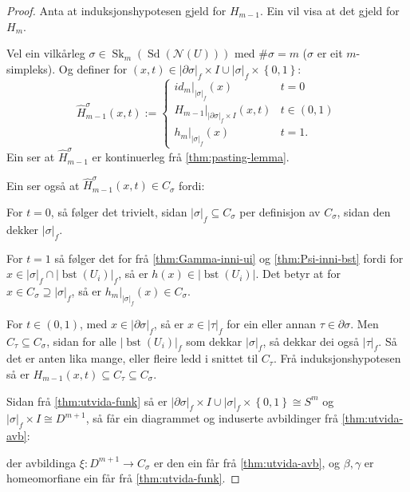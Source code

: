 \documentclass[a4paper, 12pt, norsk]{article}
\theoremstyle{plain}
\theoremstyle{definition}
\newcommand{\Nc}{\mathcal{N}}
\newcommand{\intersect}{ \mathop{\cap}\limits }
\newcommand{\union}{ \mathop{\cup}\limits }
\newcommand{\gr}[1]{ \lvert #1 \rvert } %
\newcommand{\set}[1]{ \left\{ #1 \right\} } %
\DeclareMathOperator{\Sd}{Sd} %
\DeclareMathOperator{\bst}{bst} %
\DeclareMathOperator{\Sk}{Sk} %
\begin{document}
\begin{proof}
	Anta at induksjonshypotesen gjeld for \( H_{m-1} \). Ein vil visa at det gjeld for \( H_m \).

	Vel ein vilkårleg \( \sigma \in \Sk_m(\Sd(\Nc(U))) \) med \( \#\sigma = m \) (\( \sigma \) er eit \( m \)-simpleks). Og definer for \( (x, t) \in \gr{\partial\sigma}_f \times I \union \gr{\sigma}_f \times \set{0, 1} \):
	\[
		\hat{H}_{m-1}^\sigma (x,t) := 
		\begin{cases}
			id_m|_{\gr{\sigma}_f}(x) & t=0 \\
			H_{m-1}|_{\gr{\partial\sigma}_f \times I}(x,t) & t \in (0, 1) \\
			h_m|_{\gr{\sigma}_f}(x) & t=1.
		\end{cases}
	\]
	Ein ser at \( \hat{H}_{m-1}^\sigma \) er kontinuerleg frå \autoref{thm:pasting-lemma}.
	
	Ein ser også at \( \hat{H}_{m-1}^\sigma (x,t) \in C_\sigma \) fordi: 
	
	For \( t = 0 \), så følger det trivielt, sidan \( \gr{\sigma}_f \subseteq C_\sigma \) per definisjon av \( C_\sigma \), sidan den dekker \( \gr{\sigma}_f \).
	
	For \( t = 1 \) så følger det for frå \autoref{thm:Gamma-inni-ui} og \autoref{thm:Psi-inni-bst} fordi for \( x \in \gr{\sigma}_f \intersect \gr{\bst(U_i)}_f \), så er \( h(x) \in \gr{\bst(U_i)} \). Det betyr at for \( x \in C_\sigma \supseteq \gr{\sigma}_f \), så er \( h_m|_{\gr{\sigma}_f}(x) \in C_\sigma \). 
	
	For \( t \in (0, 1) \), med \( x \in \gr{\partial\sigma}_f \), så er \( x \in \gr{\tau}_f \) for ein eller annan \( \tau \in \partial\sigma \). Men \( C_\tau \subseteq C_\sigma \), sidan for alle \( \gr{\bst(U_i)}_f \) som dekkar \( \gr{\sigma}_f \), så dekkar dei også \( \gr{\tau}_f \). Så det er anten lika mange, eller fleire ledd i snittet til \( C_\tau \). Frå induksjonshypotesen så er \( H_{m-1}(x, t) \subseteq C_{\tau} \subseteq C_\sigma \).

	Sidan frå \autoref{thm:utvida-funk} så er \( \gr{\partial\sigma}_f \times I \union \gr{\sigma}_f \times \set{0, 1} \cong S^{m} \) og \( \gr{\sigma}_f \times I \cong D^{m+1} \), så får ein diagrammet og induserte avbildinger frå \autoref{thm:utvida-avb}:

	\begin{center}
	\end{center}
	der avbildinga \( \xi: D^{m+1} \to C_\sigma \) er den ein får frå \autoref{thm:utvida-avb}, og \( \beta, \gamma \) er homeomorfiane ein får frå \autoref{thm:utvida-funk}.


\end{proof}
\end{document}
